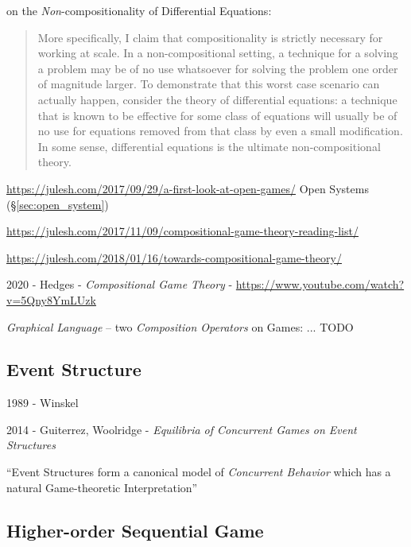 on the \emph{Non}-compositionality of Differential Equations:
\begin{quote}
  More specifically, I claim that compositionality is strictly necessary
  for working at scale. In a non-compositional setting, a technique for a
  solving a problem may be of no use whatsoever for solving the problem one
  order of magnitude larger. To demonstrate that this worst case scenario can
  actually happen, consider the theory of differential equations: a technique
  that is known to be effective for some class of equations will usually be of
  no use for equations removed from that class by even a small modification. In
  some sense, differential equations is the ultimate non-compositional theory.
\end{quote}

\url{https://julesh.com/2017/09/29/a-first-look-at-open-games/} \fist Open
Systems (\S\ref{sec:open_system})

\url{https://julesh.com/2017/11/09/compositional-game-theory-reading-list/}


\url{https://julesh.com/2018/01/16/towards-compositional-game-theory/}

\asterism

2020 - Hedges - \emph{Compositional Game Theory} -
\url{https://www.youtube.com/watch?v=5Qny8YmLUzk}

\emph{Graphical Language} -- two \emph{Composition Operators} on Games: ... TODO



\subsection{Event Structure}\label{sec:event_structure}

1989 - Winskel

2014 - Guiterrez, Woolridge - \emph{Equilibria of Concurrent Games on Event
  Structures}

``Event Structures form a canonical model of \emph{Concurrent Behavior} which
has a natural Game-theoretic Interpretation''



\subsection{Higher-order Sequential Game}\label{sec:higherorder_sequential_game}

